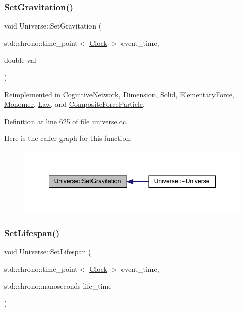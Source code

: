 \subsubsection{\texorpdfstring{Set\+Gravitation()}{SetGravitation()}}
{\footnotesize\ttfamily void Universe\+::\+Set\+Gravitation (\begin{DoxyParamCaption}\item[{std\+::chrono\+::time\+\_\+point$<$ \hyperlink{universe_8h_a0ef8d951d1ca5ab3cfaf7ab4c7a6fd80}{Clock} $>$}]{event\+\_\+time,  }\item[{double}]{val }\end{DoxyParamCaption})\hspace{0.3cm}{\ttfamily [virtual]}}



Reimplemented in \hyperlink{class_cognitive_network_af9f082a70f0cc25a3f818d9eace5a527}{Cognitive\+Network}, \hyperlink{class_dimension_aeec6887382d09e3d78382582ff4e7c33}{Dimension}, \hyperlink{class_solid_ae237f2c713868c133e28ed7f75fc9125}{Solid}, \hyperlink{class_elementary_force_aa36d5875964f7e2fc981f6fc5431be7f}{Elementary\+Force}, \hyperlink{class_monomer_ab38d44b27a46d5630aeb5e889f927c09}{Monomer}, \hyperlink{class_law_a908ccc2b0a561a7324a15393ec157219}{Law}, and \hyperlink{class_composite_force_particle_ad9e1553ab0096230edd591e3135b223d}{Composite\+Force\+Particle}.



Definition at line 625 of file universe.\+cc.

Here is the caller graph for this function\+:
\nopagebreak
\begin{figure}[H]
\begin{center}
\leavevmode
\includegraphics[width=348pt]{class_universe_ae0cb8d86b2fbb8396d605160344b42f5_icgraph}
\end{center}
\end{figure}
\mbox{\label{class_universe_ac3443dd59b61ae3110f07f681f63ed0a}} 
\subsubsection{\texorpdfstring{Set\+Lifespan()}{SetLifespan()}}
{\footnotesize\ttfamily void Universe\+::\+Set\+Lifespan (\begin{DoxyParamCaption}\item[{std\+::chrono\+::time\+\_\+point$<$ \hyperlink{universe_8h_a0ef8d951d1ca5ab3cfaf7ab4c7a6fd80}{Clock} $>$}]{event\+\_\+time,  }\item[{std\+::chrono\+::nanoseconds}]{life\+\_\+time }\end{DoxyParamCaption})}




